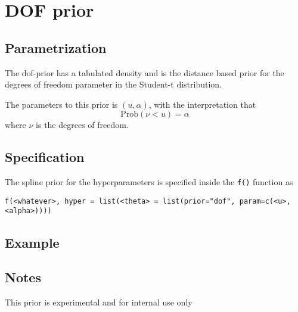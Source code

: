 \documentclass[a4paper,11pt]{article}
\begin{document}
\section*{DOF prior}

\subsection*{Parametrization}

The dof-prior has a tabulated density and is the distance based prior
for the degrees of freedom parameter in the Student-t distribution.

The parameters to this prior is $(u, \alpha{})$, with the
interpretation that
\begin{displaymath}
    \text{Prob}(\nu < u) = \alpha
\end{displaymath}
where $\nu$ is the degrees of freedom.

\subsection*{Specification}
The spline prior for the hyperparameters is specified inside the
{\tt f()} function as 
\begin{center}
    {\tt f(<whatever>, hyper = list(<theta> =
        list(prior="dof", param=c(<u>, <alpha>))))}
\end{center}

\subsection*{Example}

\subsection*{Notes}
This prior is experimental and for internal use only
\end{document}
